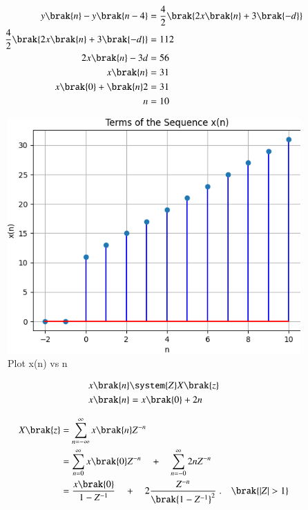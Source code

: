 \documentclass[journal,12pt,twocolumn]{IEEEtran}
\theoremstyle{remark}
\begin{document}
\begin{align}
y\brak{n}-y\brak{n-4}&=\frac{4}{2}\brak{2x\brak{n}+3\brak{-d}}\\
\frac{4}{2}\brak{2x\brak{n}+3\brak{-d}}&=112\\
2x\brak{n}-3d&=56\\
x\brak{n}&=31\\
x\brak{0}+\brak{n}2&=31\\
n&=10
\end{align}
\newpage
\begin{figure}
    \includegraphics[width=\columnwidth]{figs/fig.png}
    \centering
    Plot x(n) vs n
    \label{fig:enter-label}
\end{figure}

\begin{align}
	x \brak{n} &\system{Z} X \brak{z}\\
	x\brak{n}&=x\brak{0}+2n
\end{align}

\begin{align}
X\brak{z}&= \sum_{n=-\infty}^{\infty} x\brak{n}Z^{-n} \\
&=\sum_{n=0}^{\infty} x\brak{0}Z^{-n}\quad +\quad \sum_{n=-0}^{\infty}2nZ^{-n}\\
&=\frac{x\brak{0}}{1-Z^{-1}}\quad+\quad 2\frac{Z^{-n}}{\brak{1-Z^{-1}}^{2}}\hspace{1mm}.\quad\brak{|Z|>1}
\end{align}
\end{document}
